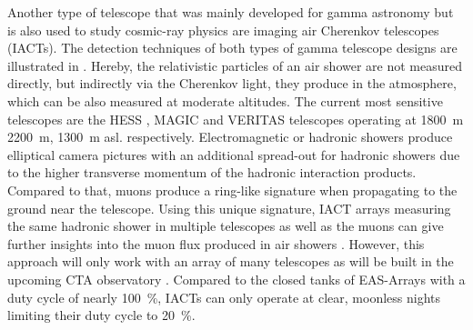 Another type of telescope that was mainly developed for gamma astronomy but is also used to study cosmic-ray physics are imaging air Cherenkov telescopes (IACTs).
The detection techniques of both types of gamma telescope designs are illustrated in .
Hereby, the relativistic particles of an air shower are not measured directly, but indirectly via the Cherenkov light, they produce in the atmosphere, which can be also measured at moderate altitudes.
The current most sensitive telescopes are the HESS \cite{HESS20}, MAGIC \cite{MAGIC16II} and VERITAS \cite{VERITAS15Science} telescopes operating at \SI{1800}{m} \SI{2200}{m}, \SI{1300}{m} asl. respectively.
Electromagnetic or hadronic showers produce elliptical camera pictures with an additional spread-out for hadronic showers due to the higher transverse momentum of the hadronic interaction products.
Compared to that, muons produce a ring-like signature when propagating to the ground near the telescope.
Using this unique signature, IACT arrays measuring the same hadronic shower in multiple telescopes as well as the muons can give further insights into the muon flux produced in air showers \cite{Mitchell19MuonIACT}.
However, this approach will only work with an array of many telescopes as will be built in the upcoming CTA observatory \cite{CTA19Science}.
Compared to the closed tanks of EAS-Arrays with a duty cycle of nearly \SI{100}{\%}, IACTs can only operate at clear, moonless nights limiting their duty cycle to \SI{20}{\%}.
